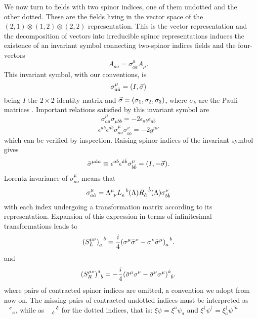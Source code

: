 We now turn to fields with two spinor indices, one of them undotted and the other dotted. These are the fields living in the vector space of the $(2,1)\otimes(1,2)\otimes(2,2)$ representation. This is the vector representation and the decomposition of vectors into irreducible spinor representations induces the existence of an invariant symbol connecting two-spinor indices  fields and the four-vectors 
\begin{equation}
    A_{a\dot{a}}=\sigma^\mu_{a\dot{a}}A_\mu.
\end{equation}
This invariant symbol, with our conventions, is
\begin{equation}
    \sigma^\mu_{a\dot{a}}=(I,\va{\sigma})
    \label{sigma1}
\end{equation}
being $I$ the $2\times2$ identity matrix and $\va{\sigma}=(\sigma_1,\sigma_2,\sigma_3)$, where $\sigma_k$ are the Pauli matrices \cite{srednicki2007quantum}.
Important relations satisfied by this invariant symbol are
\begin{equation}
    \sigma^\mu_{a\dot{a}}\sigma_{\mu b\dot{b}}=-2\epsilon_{ab}\epsilon_{\dot{a}\dot{b}}
\end{equation}
\begin{equation}
    \epsilon^{ab}\epsilon^{\dot{a}\dot{b}}\sigma^\mu_{a\dot{a}}\sigma^\nu_{b\dot{b}}=-2g^{\mu\nu}
\end{equation}
which can be verified by inspection.
Raising spinor indices of the invariant symbol gives
\begin{equation}
    \bar{\sigma}^{\mu\dot{a}a}\equiv\epsilon^{ab}\epsilon^{\dot{a}\dot{b}}\sigma^\mu_{b\dot{b}}=(I,-\va{\sigma}).
    \label{sigma2}
\end{equation}
Lorentz invariance of $\sigma^\mu_{a\dot{a}}$ means that
\begin{equation}
    \sigma^\mu_{a\dot{a}}=\ten{\Lambda}{\mu}{\nu}\tend{L}{a}{b}(\Lambda)\tend{R}{\dot{a}}{\dot{b}}(\Lambda)\sigma^\nu_{b\dot{b}}
\end{equation}
with each index undergoing a transformation matrix according to its representation. Expansion of this expression in terms of infinitesimal transformations leads to \cite{srednicki2007quantum}
\begin{equation}
    \tend{(S^{\mu\nu}_L)}{a}{b}=\frac{i}{4}\tend{(\sigma^\mu\bar{\sigma}^\nu-\sigma^\nu\bar{\sigma}^\mu)}{a}{b}.
    \label{SL}
\end{equation}
and
\begin{equation}
    \ten{(S^{\mu\nu}_R)}{\dot{a}}{\dot{b}}=-\frac{i}{4}\ten{(\bar{\sigma}^\mu{\sigma}^\nu-\bar{\sigma}^\nu{\sigma}^\mu)}{\dot{a}}{\dot{b}}.
    \label{SR}
\end{equation}
where pairs of contracted spinor indices are omitted, a convention we adopt from now on. The missing pairs of contracted undotted indices must be interpreted as $\ten{\phantom{A}}{c}{c}$, while as $\tend{\phantom{A}}{\dot{c}}{\dot{c}}$  for the dotted indices, that is: $\xi\psi=\xi^a\psi_a$ and $\xi^\dagger\psi^\dagger=\xi^\dagger_{\dot{a}}\psi^{\dagger\dot{a}}$

